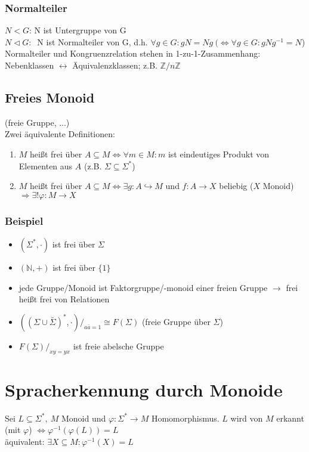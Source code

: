         \subsubsection{Normalteiler}
            $N<G$: N ist Untergruppe von G\\
            $N\triangleleft G:\ $
            N ist Normalteiler von G, d.h. $\forall g\in G : gN=Ng\ (\Leftrightarrow \forall g\in G : gNg^{-1}=N$)\\
            Normalteiler und Kongruenzrelation stehen in 1-zu-1-Zusammenhang: Nebenklassen $\leftrightarrow$ Äquivalenzklassen; z.B. $\mathds{Z}/n\mathds{Z}$
    \subsection{Freies Monoid}
        (freie Gruppe, ...)\\
        Zwei äquivalente Definitionen:
        \begin{enumerate}
            \item $M$ heißt frei über $A\subseteq M\Leftrightarrow \forall m\in M: m$ ist eindeutiges Produkt von Elementen aus $A$ (z.B. $\Sigma\subseteq\Sigma^*$)
            \item $M$ heißt frei über $A\subseteq M\Leftrightarrow \exists g:A\hookrightarrow M$ und $f:A\rightarrow X$ beliebig ($X$ Monoid) $\Rightarrow \exists!\varphi:M\rightarrow X$
        \end{enumerate}
        \subsubsection{Beispiel}
            \begin{itemize}
                \item $(\Sigma^*,\cdot)$ ist frei über $\Sigma$
                \item $(\mathds{N},+)$ ist frei über $\{1\}$
                \item jede Gruppe/Monoid ist Faktorgruppe/-monoid einer freien Gruppe $\rightarrow$ frei heißt frei von Relationen
                \item $\left(\left(\Sigma\cup\bar{\Sigma}\right)^*,\cdot \right)/_{a\bar{a}=1}\cong F(\Sigma)$ (freie Gruppe über $\Sigma$)
                \item $F(\Sigma)/_{xy=yx}$ ist freie abelsche Gruppe
            \end{itemize}
\section{Spracherkennung durch Monoide}
    Sei $L\subseteq\Sigma^*,\ M$ Monoid und $\varphi:\Sigma^*\rightarrow M$ Homomorphismus. $L$ wird von $M$ erkannt (mit $\varphi$) $\Leftrightarrow \varphi^{-1}\left(\varphi(L)\right)=L$\\
    äquivalent: $\exists X\subseteq M: \varphi^{-1}(X)=L$
